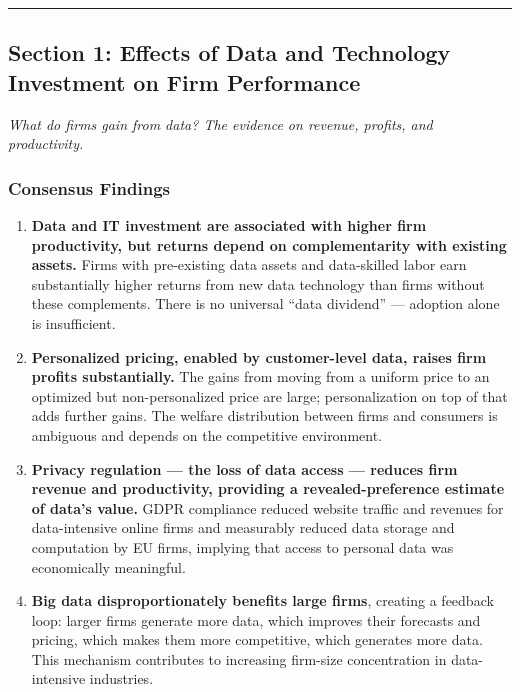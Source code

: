 \documentclass[
]{article}
\begin{document}
\begin{center}\rule{0.5\linewidth}{0.5pt}\end{center}

\hypertarget{section-1-effects-of-data-and-technology-investment-on-firm-performance}{%
\subsection{Section 1: Effects of Data and Technology Investment on Firm
Performance}\label{section-1-effects-of-data-and-technology-investment-on-firm-performance}}

\emph{What do firms gain from data? The evidence on revenue, profits,
and productivity.}

\hypertarget{consensus-findings}{%
\subsubsection{Consensus Findings}\label{consensus-findings}}

\begin{enumerate}
\def\labelenumi{\arabic{enumi}.}
\item
  \textbf{Data and IT investment are associated with higher firm
  productivity, but returns depend on complementarity with existing
  assets.} Firms with pre-existing data assets and data-skilled labor
  earn substantially higher returns from new data technology than firms
  without these complements. There is no universal ``data dividend'' ---
  adoption alone is insufficient.
\item
  \textbf{Personalized pricing, enabled by customer-level data, raises
  firm profits substantially.} The gains from moving from a uniform
  price to an optimized but non-personalized price are large;
  personalization on top of that adds further gains. The welfare
  distribution between firms and consumers is ambiguous and depends on
  the competitive environment.
\item
  \textbf{Privacy regulation --- the loss of data access --- reduces
  firm revenue and productivity, providing a revealed-preference
  estimate of data's value.} GDPR compliance reduced website traffic and
  revenues for data-intensive online firms and measurably reduced data
  storage and computation by EU firms, implying that access to personal
  data was economically meaningful.
\item
  \textbf{Big data disproportionately benefits large firms}, creating a
  feedback loop: larger firms generate more data, which improves their
  forecasts and pricing, which makes them more competitive, which
  generates more data. This mechanism contributes to increasing
  firm-size concentration in data-intensive industries.
\end{enumerate}
\end{document}
